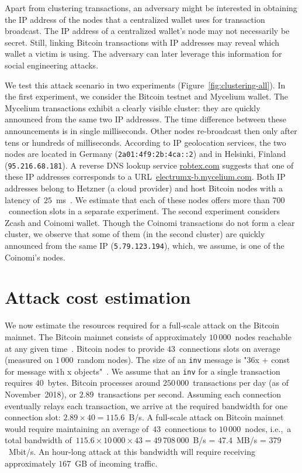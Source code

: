 Apart from clustering transactions, an adversary might be interested in obtaining the IP address of the nodes that a centralized wallet uses for transaction broadcast.
The IP address of a centralized wallet's node may not necessarily be secret.
Still, linking Bitcoin transactions with IP addresses may reveal which wallet a victim is using.
The adversary can later leverage this information for social engineering attacks.

We test this attack scenario in two experiments (Figure~\ref{fig:clustering-all}).
In the first experiment, we consider the Bitcoin testnet and Mycelium wallet.
The Mycelium transactions exhibit a clearly visible cluster: they are quickly announced from the same two IP addresses.
The time difference between these announcements is in single milliseconds.
Other nodes re-broadcast then only after tens or hundreds of milliseconds.
According to IP geolocation services, the two nodes are located in Germany (\texttt{2a01:4f9:2b:4ca::2}) and in Helsinki, Finland (\texttt{95.216.68.181}).
A reverse DNS lookup service \url{robtex.com} suggests that one of these IP addresses corresponds to a URL~\url{electrumx-b.mycelium.com}.
Both IP addresses belong to Hetzner (a cloud provider) and host Bitcoin nodes with a latency of~$25$~ms~\cite{Bitnodes}.
We estimate that each of these nodes offers more than $700$~connection slots in a separate experiment.
The second experiment considers Zcash and Coinomi wallet.
Though the Coinomi transactions do not form a clear cluster, we observe that some of them (in the second cluster) are quickly announced from the same IP (\texttt{5.79.123.194}), which, we assume, is one of the Coinomi's nodes.


\section{Attack cost estimation}

We now estimate the resources required for a full-scale attack on the Bitcoin mainnet.
The Bitcoin mainnet consists of approximately $10\,000$~nodes reachable at any given time~\cite{Bitnodes}.
Bitcoin nodes to provide $43$~connections slots on average (measured on $1\,000$~random nodes).
The size of an \texttt{inv} message is "36x + const for message with x objects"~\cite{BitcoinWiki}.
We assume that an \texttt{inv} for a single transaction requires $40$~bytes.
Bitcoin processes around $250\,000$~transactions per day (as of November~2018), or $2.89$~transactions per second.
Assuming each connection eventually relays each transaction, we arrive at the required bandwidth for one connection slot: $2.89 \times 40 = 115.6$~B/s.
A full-scale attack on Bitcoin mainnet would require maintaining an average of~$43$~connections to $10\,000$~nodes, i.e.,~a total bandwidth of~$115.6 \times 10\,000 \times 43 = 49\,708\,000$~B/s = $47.4$~MB/s = $379$~Mbit/s.
An hour-long attack at this bandwidth will require receiving approximately $167$~GB of incoming traffic.

